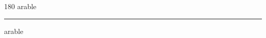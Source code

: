 
\begin{frame}
\begin{center}
\begin{turn}{180}
{\fontsize{2.5cm}{1em}\selectfont arable}
\end{turn}
\vspace{1em}\par  
\hrule
\vspace{1em}\par  
{\fontsize{2.5cm}{1em}\selectfont arable}
\end{center}
\end{frame}
